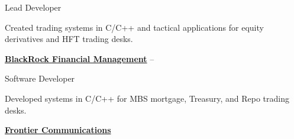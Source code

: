 \documentclass[letterpaper,MMMMyyyy,nonstopmode]{simpleresumecv}
\newif\ifLOCATION
\begin{document}
\begin{Body}
Lead Developer
\ifLOCATION
\hfill
New York, New York
\fi

\begin{Detail}
Created trading systems in C/C++ and tactical applications for equity derivatives and HFT trading desks.

\end{Detail}

\BigGap
\Entry
\href{http://www.blackrock.com/}
{\textbf{BlackRock Financial Management}}
\hfill 
 --  

Software Developer
\ifLOCATION
\hfill
New York, New York
\fi

\begin{Detail}
Developed systems in C/C++ for MBS mortgage, Treasury, and Repo trading desks.
\end{Detail}

\iffalse
\BigGap
\Entry
\textbf{Prophet 21, Inc.}
\hfill 
Yardley, Pennsylvania

Associate Developer
\hfill
\DatestampYM{1992}{06} --  \DatestampYM{1993}{03}

\begin{Detail}
\BulletItem
Wrote and maintained features for point-of-sale systems targeted to retailers and wholesalers

\Gap
Technologies: Sybase, ksh
\end{Detail}
\fi

\else

\iffalse %
\BigGap
\Entry
\href{http://www.paychex.com/}
{\textbf{Paychex}}

\begin{Detail}
	Led team of 5 to create three public-facing fullstack Java/JavaScript applications.

	Created CI/CD deployment pipelines with Hudson.
\end{Detail}
\fi %

\BigGap
\Entry
\href{http://www.frontier.com/}
{\textbf{Frontier Communications}}


\end{Body}
\end{document}
